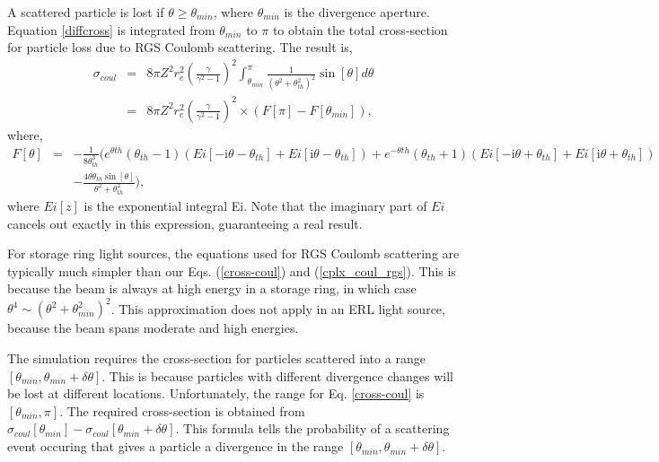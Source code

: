 \documentclass[a4paper,10pt]{article}
\begin{document}
A scattered particle is lost if $\theta\geq\theta_{min}$, where $\theta_{min}$ is the divergence aperture.  Equation \ref{diffcross} is integrated from $\theta_{min}$ to $\pi$ to obtain the total cross-section for particle loss due to RGS Coulomb scattering. The result is,
\begin{eqnarray}
\sigma_{coul}&=&8\pi Z^2 r_e^2\left(\frac{\gamma}{\gamma^2-1}\right)^2\int_{\theta_{min}}^{\pi}
\frac{1}{\left(\theta^2+\theta_{th}^2\right)^2}\sin\left[\theta\right]d\theta\nonumber\\
&=&8\pi Z^2 r_e^2\left(\frac{\gamma}{\gamma^2-1}\right)^2 \times \left(F\left[\pi\right]-F\left[\theta_{min}\right]\right)\textrm{,}
\label{cross-coul}
\end{eqnarray}
where,
\begin{eqnarray}
F\left[\theta\right]&=&-\frac{1}{8 \theta_{th}^3}\bigg(e^{\theta th}\left(\theta_{th}-1\right)
\left(Ei\left[-\textrm{i}\theta-\theta_{th}\right]+Ei\left[\textrm{i}\theta-\theta_{th}\right]\right)
+e^{-\theta th}\left(\theta_{th}+1\right)
\left(Ei\left[-\textrm{i}\theta+\theta_{th}\right]+Ei\left[\textrm{i}\theta+\theta_{th}\right]\right)\nonumber\\
&&-\frac{4\theta\theta_{th}\sin\left[\theta\right]}{\theta^2+\theta_{th}^2}\bigg)
\textrm{,}
\label{cplx_coul_rgs}
\end{eqnarray}
where $Ei\left[z\right]$ is the exponential integral Ei.  Note that the imaginary part of $Ei$ cancels out
exactly in this expression, guaranteeing a real result.

For storage ring light sources, the equations used for RGS Coulomb scattering are typically much simpler than 
our Eqs. (\ref{cross-coul}) and (\ref{cplx_coul_rgs}).
This is because the beam is always at high energy in a storage ring, in which case $\theta^4 \sim \left(\theta^2+\theta_{min}^2\right)^2$.
This approximation does not apply in an ERL light source, because the beam spans moderate and high energies.

The simulation requires the cross-section for particles scattered into a range $\left[\theta_{min},\theta_{min}+\delta\theta\right]$.
This is because particles with different divergence changes will be lost at different locations.
Unfortunately, the range for Eq. \ref{cross-coul} is $\left[\theta_{min},\pi\right]$.  The required cross-section is obtained 
from $\sigma_{coul}\left[\theta_{min}\right]-\sigma_{coul}\left[\theta_{min}+\delta\theta\right]$.  This formula tells the probability
of a scattering event occuring that gives a particle a divergence in the range $\left[\theta_{min},\theta_{min}+\delta\theta\right]$.
\end{document}
